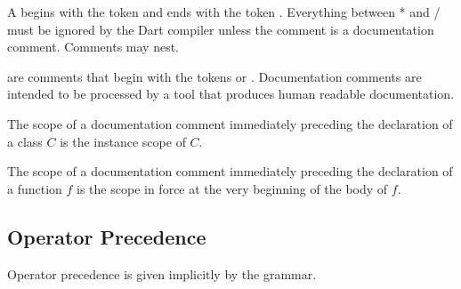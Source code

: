 \documentclass[makeidx]{article}
\begin{document}
{\LMHash{}%
A  begins with the token \code{/*} and ends with the token \code{*/}.
Everything between \code{/}* and \code{*}/ must be ignored by the Dart compiler unless the comment is a documentation comment.
Comments may nest.

\LMHash{}%
are comments that begin with the tokens \code{///} or \code{/**}.
Documentation comments are intended to be processed by a tool that produces human readable documentation.

\LMHash{}%
The scope of a documentation comment immediately preceding the declaration of a class $C$ is the instance scope of $C$.

\LMHash{}%
The scope of a documentation comment immediately preceding the declaration of a function $f$ is the scope in force at the very beginning of the body of $f$.


\subsection{Operator Precedence}

\LMHash{}%
Operator precedence is given implicitly by the grammar.

}
\end{document}
